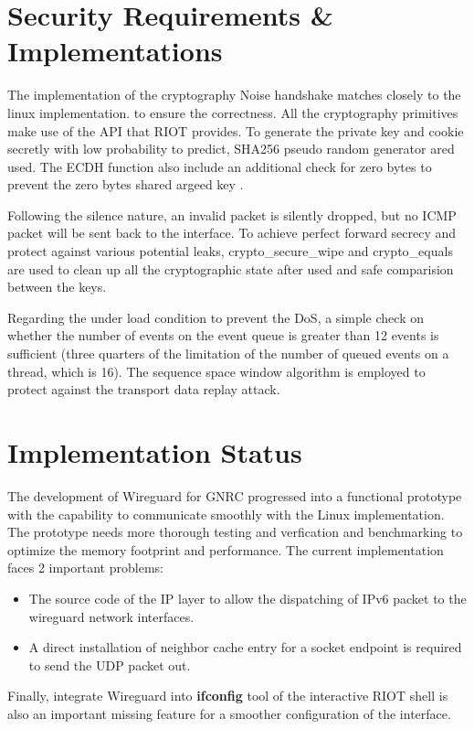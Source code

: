 \section{Security Requirements \& Implementations}
  The implementation of the cryptography Noise handshake matches closely to the linux implementation.
  to ensure the correctness. All the cryptography primitives make use of the API that RIOT 
  provides. To generate the private key and cookie secretly with low probability to predict, SHA256
  \cite{rfc6234} pseudo random generator ared used. The ECDH function also include an 
  additional check for zero bytes to prevent the zero bytes shared argeed key \cite{zeros}.

  Following the silence nature, an invalid packet is silently dropped, but no ICMP packet
  will be sent back to the interface. To achieve perfect forward secrecy and protect
  against various potential leaks, crypto{\_}secure{\_}wipe and crypto{\_}equals are used to
  clean up all the cryptographic state after used and safe comparision between the keys.

  Regarding the under load condition to prevent the DoS, a simple check on whether the number
  of events on the event queue is greater than 12 events is sufficient (three quarters of 
  the limitation of the number of queued events on a thread, which is 16). The sequence space
  window algorithm \cite[appendix C]{rfc2401} is employed to protect against the transport data replay attack.

\section{Implementation Status}
  The development of Wireguard for GNRC progressed into a functional prototype with the capability
  to communicate smoothly with the Linux implementation. The prototype needs more thorough
  testing and verfication and benchmarking to optimize the memory footprint and performance.
  The current implementation faces 2 important problems:
  \begin{itemize}
    \item The source code of the IP layer to allow the dispatching of IPv6 packet to the 
    wireguard network interfaces.
    \item A direct installation of neighbor cache entry for a socket endpoint is required to
    send the UDP packet out.
  \end{itemize}
  Finally, integrate Wireguard into \textbf{ifconfig} tool of the interactive RIOT shell is also
  an important missing feature for a smoother configuration of the interface.